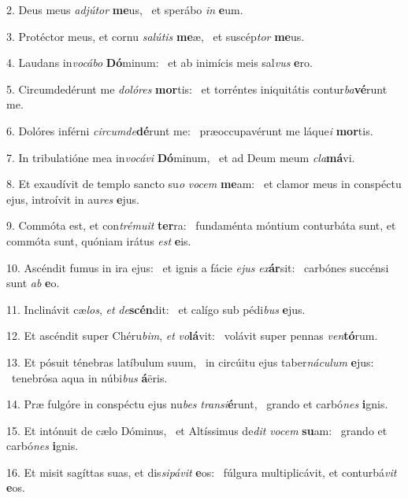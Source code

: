 2. Deus meus \textit{ad}\textit{jú}\textit{tor} \textbf{me}us, \ast\  et sperábo \textit{in} \textbf{e}um.\

3. Protéctor meus, et cornu \textit{sa}\textit{lú}\textit{tis} \textbf{me}æ, \ast\  et suscép\textit{tor} \textbf{me}us.\

4. Laudans in\textit{vo}\textit{cá}\textit{bo} \textbf{Dó}minum: \ast\  et ab inimícis meis sal\textit{vus} \textbf{e}ro.\

5. Circumdedérunt me \textit{do}\textit{ló}\textit{res} \textbf{mor}tis: \ast\  et torréntes iniquitátis contur\textit{ba}\textbf{vé}runt me.\

6. Dolóres inférni \textit{cir}\textit{cum}\textit{de}\textbf{dé}runt me: \ast\  præoccupavérunt me láque\textit{i} \textbf{mor}tis.\

7. In tribulatióne mea in\textit{vo}\textit{cá}\textit{vi} \textbf{Dó}minum, \ast\  et ad Deum meum \textit{cla}\textbf{má}vi.\

8. Et exaudívit de templo sancto su\textit{o} \textit{vo}\textit{cem} \textbf{me}am: \ast\  et clamor meus in conspéctu ejus, introívit in au\textit{res} \textbf{e}jus.\

9. Commóta est, et con\textit{tré}\textit{mu}\textit{it} \textbf{ter}ra: \ast\  fundaménta móntium conturbáta sunt, et commóta sunt, quóniam irátus \textit{est} \textbf{e}is.\

10. Ascéndit fumus in ira ejus: \dag\  et ignis a fácie \textit{e}\textit{jus} \textit{ex}\textbf{ár}sit: \ast\  carbónes succénsi sunt \textit{ab} \textbf{e}o.\

11. Inclinávit cæ\textit{los}, \textit{et} \textit{de}\textbf{scén}dit: \ast\  et calígo sub pédi\textit{bus} \textbf{e}jus.\

12. Et ascéndit super Chéru\textit{bim}, \textit{et} \textit{vo}\textbf{lá}vit: \ast\  volávit super pennas \textit{ven}\textbf{tó}rum.\

13. Et pósuit ténebras latíbulum suum, \dag\  in circúitu ejus taber\textit{ná}\textit{cu}\textit{lum} \textbf{e}jus: \ast\  tenebrósa aqua in núbi\textit{bus} \textbf{á}ëris.\

14. Præ fulgóre in conspéctu ejus nu\textit{bes} \textit{trans}\textit{i}\textbf{é}runt, \ast\  grando et carbó\textit{nes} \textbf{i}gnis.\

15. Et intónuit de cælo Dóminus, \dag\  et Altíssimus de\textit{dit} \textit{vo}\textit{cem} \textbf{su}am: \ast\  grando et carbó\textit{nes} \textbf{i}gnis.\

16. Et misit sagíttas suas, et dis\textit{si}\textit{pá}\textit{vit} \textbf{e}os: \ast\  fúlgura multiplicávit, et conturbá\textit{vit} \textbf{e}os.\

